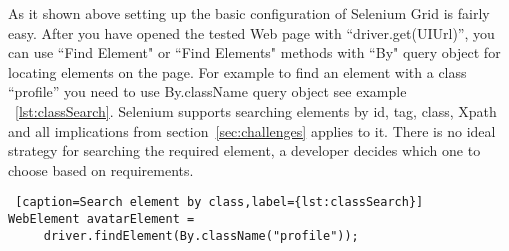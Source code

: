 	As it shown above setting up the basic configuration of Selenium Grid is fairly
	easy. After you have opened the tested Web page with ``driver.get(UIUrl)'', you
	can use ``Find Element" or ``Find Elements" methods with ``By" query object for
	locating elements on the page. For example to find an element with a
	class ``profile'' you need to use By.className query object see example
	~\ref{lst:classSearch}. Selenium  supports searching elements by id, tag,
	class, Xpath and all implications from section~\ref{sec:challenges} applies to it. 
	There is no ideal strategy for searching the required element, a developer
	decides which one to choose based on requirements.
	
	\lstset{style=a1listing}
	\begin{lstlisting} [caption=Search element by class,label={lst:classSearch}]
WebElement avatarElement = 
	 driver.findElement(By.className("profile"));
	\end{lstlisting}